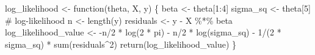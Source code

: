 \documentclass[
  letterpaper,
  DIV=11,
  numbers=noendperiod]{scrartcl}
\newenvironment{Shaded}{\begin{snugshade}}{\end{snugshade}}
\newcommand{\CommentTok}[1]{\textcolor[rgb]{0.37,0.37,0.37}{#1}}
\newcommand{\ControlFlowTok}[1]{\textcolor[rgb]{0.00,0.23,0.31}{#1}}
\newcommand{\DecValTok}[1]{\textcolor[rgb]{0.68,0.00,0.00}{#1}}
\newcommand{\FunctionTok}[1]{\textcolor[rgb]{0.28,0.35,0.67}{#1}}
\newcommand{\NormalTok}[1]{\textcolor[rgb]{0.00,0.23,0.31}{#1}}
\newcommand{\OtherTok}[1]{\textcolor[rgb]{0.00,0.23,0.31}{#1}}
\newcommand{\SpecialCharTok}[1]{\textcolor[rgb]{0.37,0.37,0.37}{#1}}
\begin{document}
\begin{Shaded}
\begin{Highlighting}[]
\NormalTok{log\_likelihood }\OtherTok{\textless{}{-}} \ControlFlowTok{function}\NormalTok{(theta, X, y) \{}
\NormalTok{      beta }\OtherTok{\textless{}{-}}\NormalTok{ theta[}\DecValTok{1}\SpecialCharTok{:}\DecValTok{4}\NormalTok{]}
\NormalTok{      sigma\_sq }\OtherTok{\textless{}{-}}\NormalTok{ theta[}\DecValTok{5}\NormalTok{]}
      \CommentTok{\# log{-}likelihood}
\NormalTok{      n }\OtherTok{\textless{}{-}} \FunctionTok{length}\NormalTok{(y)}
\NormalTok{      residuals }\OtherTok{\textless{}{-}}\NormalTok{ y }\SpecialCharTok{{-}}\NormalTok{ X }\SpecialCharTok{\%*\%}\NormalTok{ beta}
\NormalTok{      log\_likelihood\_value }\OtherTok{\textless{}{-}} \SpecialCharTok{{-}}\NormalTok{n}\SpecialCharTok{/}\DecValTok{2} \SpecialCharTok{*} \FunctionTok{log}\NormalTok{(}\DecValTok{2} \SpecialCharTok{*}\NormalTok{ pi) }\SpecialCharTok{{-}}\NormalTok{ n}\SpecialCharTok{/}\DecValTok{2} \SpecialCharTok{*} \FunctionTok{log}\NormalTok{(sigma\_sq) }\SpecialCharTok{{-}} \DecValTok{1}\SpecialCharTok{/}\NormalTok{(}\DecValTok{2} \SpecialCharTok{*}\NormalTok{ sigma\_sq) }\SpecialCharTok{*} \FunctionTok{sum}\NormalTok{(residuals}\SpecialCharTok{\^{}}\DecValTok{2}\NormalTok{)}
    \FunctionTok{return}\NormalTok{(log\_likelihood\_value)}
\NormalTok{  \}}
\end{Highlighting}
\end{Shaded}
\end{document}
